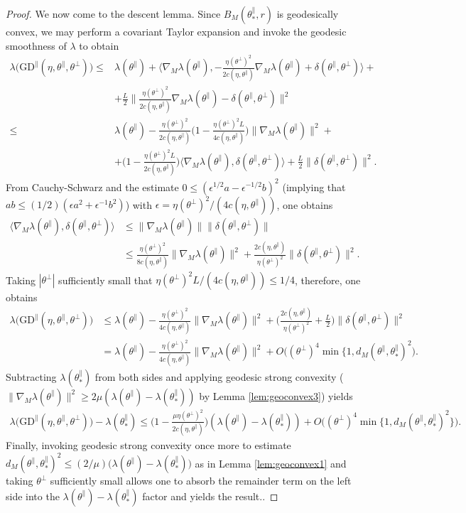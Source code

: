 \documentclass{article}
\newcommand{\tpa}{\theta^{\parallel}}
\newcommand{\tpe}{\theta^{\perp}}
\newcommand{\GD}{\mathrm{GD}}
\theoremstyle{plain}
\theoremstyle{definition}
\theoremstyle{remark}
\begin{document}
\begin{proof}
    We now come to the descent lemma. Since $B_M(\tpa_*,r)$ is geodesically convex, we may perform a covariant Taylor expansion and invoke the geodesic smoothness of $\lambda$ to obtain
    \begin{align}
        \lambda\big(\GD^{\parallel}(\eta,\tpa,\tpe)\big)\leq& \lambda(\tpa) + \bigg\langle \nabla_M\lambda(\tpa),-\frac{\eta(\tpe)^2}{2c(\eta,\tpa)}\nabla_M\lambda(\tpa)+\delta(\tpa,\tpe)\bigg\rangle+\\& + \frac{L}{2}\bigg\|\frac{\eta(\tpe)^2}{2c(\eta,\tpa)}\nabla_M\lambda(\tpa)-\delta(\tpa,\tpe)\bigg\|^2\\\leq&\lambda(\tpa)-\frac{\eta(\tpe)^2}{2c(\eta,\tpa)}\bigg(1-\frac{\eta(\tpe)^2L}{4c(\eta,\tpa)}\bigg)\|\nabla_M\lambda(\tpa)\|^2 + \\&+\bigg(1-\frac{\eta(\tpe)^2L}{2c(\eta,\tpa)}\bigg)\langle\nabla_M\lambda(\tpa),\delta(\tpa,\tpe)\rangle + \frac{L}{2}\|\delta(\tpa,\tpe)\|^2.
    \end{align}
    From Cauchy-Schwarz and the estimate $0\leq (\epsilon^{1/2}a-\epsilon^{-1/2}b)^2$ (implying that $ab\leq (1/2)(\epsilon a^2+\epsilon^{-1}b^2)$) with $\epsilon =\eta(\tpe)^2/(4c(\eta,\tpa))$, one obtains
    \begin{align}
        \langle\nabla_M\lambda(\tpa),\delta(\tpa,\tpe)\rangle&\leq \|\nabla_M\lambda(\tpa)\|\|\delta(\tpa,\tpe)\|\\&\leq \frac{\eta(\tpe)^2}{8c(\eta,\tpa)}\|\nabla_M\lambda(\tpa)\|^2+\frac{2c(\eta,\tpa)}{\eta(\tpe)^2}\|\delta(\tpa,\tpe)\|^2.
    \end{align}
    Taking $|\tpe|$ sufficiently small that $\eta(\tpe)^2L/(4c(\eta,\tpa))\leq 1/4$, therefore, one obtains
    \begin{align}
        \lambda\big(\GD^{\parallel}(\eta,\tpa,\tpe)\big)&\leq \lambda(\tpa) - \frac{\eta(\tpe)^2}{4c(\eta,\tpa)}\|\nabla_M\lambda(\tpa)\|^2 + \bigg(\frac{2c(\eta,\tpa)}{\eta(\tpe)^2} + \frac{L}{2}\bigg)\|\delta(\tpa,\tpe)\|^2\\&=\lambda(\tpa)-\frac{\eta(\tpe)^2}{4c(\eta,\tpa)}\|\nabla_M\lambda(\tpa)\|^2 + O\big((\tpe)^4\min\{1,d_M(\tpa,\tpa_*)^2\big).
    \end{align}
    Subtracting $\lambda(\tpa_*)$ from both sides and applying geodesic strong convexity ($\|\nabla_M\lambda(\tpa)\|^2\geq 2\mu(\lambda(\tpa)-\lambda(\tpa_*))$ by Lemma \ref{lem:geoconvex3}) yields
    \begin{align}
        \lambda\big(\GD^{\parallel}(\eta,\tpa,\tpe)\big)-\lambda(\tpa_*)\leq \bigg(1-\frac{\mu\eta(\tpe)^2}{2c(\eta,\tpa)}\bigg)(\lambda(\tpa)-\lambda(\tpa_*)) + O\big((\tpe)^4\min\{1,d_M(\tpa,\tpa_*)^2\}\big).
    \end{align}
    Finally, invoking geodesic strong convexity once more to estimate $d_M(\tpa,\tpa_*)^2\leq (2/\mu)\big(\lambda(\tpa)-\lambda(\tpa_*)\big)$ as in Lemma \ref{lem:geoconvex1} and taking $\tpe$ sufficiently small allows one to absorb the remainder term on the left side into the $\lambda(\tpa)-\lambda(\tpa_*)$ factor and yields the result..
\end{proof}
\end{document}
